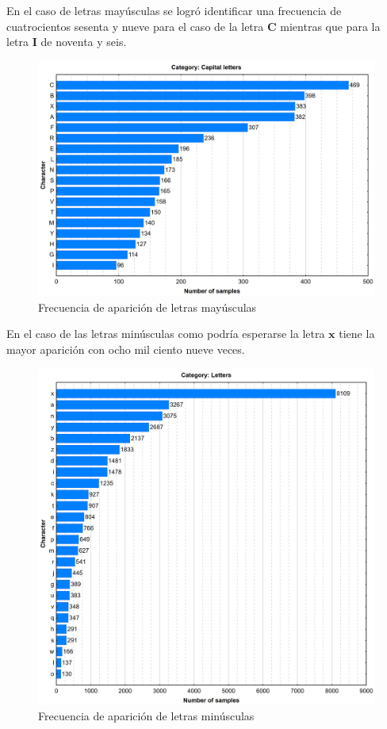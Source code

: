 En el caso de letras mayúsculas se logró identificar una frecuencia de cuatrocientos sesenta y nueve para el caso de la letra \textbf{C} mientras que para la letra \textbf{I} de noventa y seis.
\begin{figure}[H]
	\centering
	\includegraphics[width=1\textwidth]{capitulo3/imgs/capital_letters_distribution.png}
	\caption{Frecuencia de aparición de letras mayúsculas}
	\label{fig:CapLetters}
\end{figure}
\newpage
En el caso de las letras minúsculas como podría esperarse la letra $\textbf{x}$ tiene la mayor aparición con ocho mil ciento nueve veces.
\begin{figure}[H]
	\centering
	\includegraphics[width=1\textwidth]{capitulo3/imgs/lowercase_letters_distribution.png}
	\caption{Frecuencia de aparición de letras minúsculas}
	\label{fig:LowerLetters}
\end{figure}

